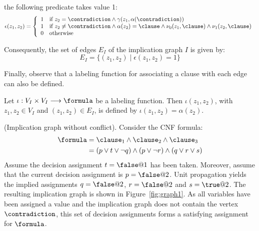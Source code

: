 \begin{definition}
    the following predicate takes value 1:
    \begin{equation}
        \epsilon(z_1, z_2) = 
        \left\{
            \begin{array}{ll}
                1 & \text{if $z_2 = \contradiction \land \gamma(z_1, \alpha(\contradiction))$}\\
                1 & \text{if $z_2 \neq \contradiction \land \alpha(z_2) = \clause \land \nu_0(z_1, \clause) \land \nu_1(z_2, \clause)$}\\
                0 & \text{otherwise}
            \end{array}
        \right.
    \end{equation}
\end{definition}

Consequently, the set of edges $E_I$ of the implication graph $I$ is given by:
\begin{equation}
    E_I = \{ (z_1, z_2) \mid \epsilon(z_1, z_2) = 1\}
\end{equation}

Finally, observe that a labeling function for associating a clause with each
edge can also be defined. 

\begin{definition}
    Let $\iota : V_I \times V_I \longrightarrow \formula$ be a labeling
    function. Then $\iota(z_1, z_2)$, with $z_1, z_2 \in V_I$ and $(z_1, z_2)
    \in E_I$, is defined by $\iota(z_1, z_2) = \alpha(z_2)$.
\end{definition}

\begin{example}%
    \label{ex:graph1}
    (Implication graph without conflict). Consider the CNF formula:
    \begin{align*}
        \formula & = \clause_1 \land \clause_2 \land \clause_3\\
                 & = (p \lor t \lor \neg q) \land (p \lor \neg r) \land (q \lor r \lor s)
    \end{align*}
    Assume the decision assignment $t = \false @1$ has been taken. Moreover,
    assume that the current decision assignment is $p = \false @2$. Unit
    propagation yields the implied assignments $q = \false @2$, $r = \false @2$
    and $s = \true @2$. The resulting implication graph is shown in
    Figure~\ref{fig:graph1}. As all variables have been assigned a value and the
    implication graph does not contain the vertex $\contradiction$, this set of decision
    assignments forms a satisfying assignment for $\formula$.
    
\end{example}

